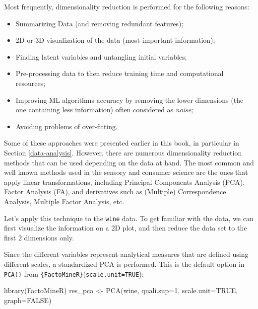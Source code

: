 \documentclass[
]{krantz}
\makeatletter
\newenvironment{Shaded}{\begin{snugshade}}{\end{snugshade}}
\newcommand{\AttributeTok}[1]{\textcolor[rgb]{0.61,0.61,0.61}{#1}}
\newcommand{\ConstantTok}[1]{\textcolor[rgb]{0,0,0}{#1}}
\newcommand{\DecValTok}[1]{\textcolor[rgb]{0.06,0.06,0.06}{#1}}
\newcommand{\FunctionTok}[1]{\textcolor[rgb]{0,0,0}{#1}}
\newcommand{\NormalTok}[1]{#1}
\newcommand{\OtherTok}[1]{\textcolor[rgb]{0.37,0.37,0.37}{#1}}
\providecommand{\tightlist}{%
  \setlength{\itemsep}{0pt}\setlength{\parskip}{0pt}}
\newenvironment{kframe}{%
\medskip{}
\setlength{\fboxsep}{.8em}
 \def\at@end@of@kframe{}%
 \ifinner\ifhmode%
  \def\at@end@of@kframe{\end{minipage}}%
  \begin{minipage}{\columnwidth}%
 \fi\fi%
 \def\FrameCommand##1{\hskip\@totalleftmargin \hskip-\fboxsep
 \colorbox{shadecolor}{##1}\hskip-\fboxsep
     \hskip-\linewidth \hskip-\@totalleftmargin \hskip\columnwidth}%
 \MakeFramed {\advance\hsize-\width
   \@totalleftmargin\z@ \linewidth\hsize
   \@setminipage}}%
 {\par\unskip\endMakeFramed%
 \at@end@of@kframe}
\renewenvironment{Shaded}{\begin{kframe}}{\end{kframe}}
\makeatother
\begin{document}
Most frequently, dimensionality reduction is performed for the following reasons:

\begin{itemize}
\tightlist
\item
  Summarizing Data (and removing redundant features);
\item
  2D or 3D visualization of the data (most important information);
\item
  Finding latent variables and untangling initial variables;
\item
  Pre-processing data to then reduce training time and computational resources;
\item
  Improving ML algorithms accuracy by removing the lower dimensions (the one containing less information) often considered as \emph{noise};
\item
  Avoiding problems of over-fitting.
\end{itemize}

Some of these approaches were presented earlier in this book, in particular in Section \ref{data-analysis}. However, there are numerous dimensionality reduction methods that can be used depending on the data at hand. The most common and well known methods used in the sensory and consumer science are the ones that apply linear transformations, including Principal Components Analysis (PCA), Factor Analysis (FA), and derivatives such as (Multiple) Correspondence Analysis, Multiple Factor Analysis, etc.

Let's apply this technique to the \texttt{wine} data. To get familiar with the data, we can first visualize the information on a 2D plot, and then reduce the data set to the first 2 dimensions only.

Since the different variables represent analytical measures that are defined using different scales, a standardized PCA is performed. This is the default option in \texttt{PCA()} from \texttt{\{FactoMineR\}}(\texttt{scale.unit=TRUE}):

\begin{Shaded}
\begin{Highlighting}[]
\FunctionTok{library}\NormalTok{(FactoMineR)}
\NormalTok{res\_pca }\OtherTok{\textless{}{-}} \FunctionTok{PCA}\NormalTok{(wine, }\AttributeTok{quali.sup=}\DecValTok{1}\NormalTok{, }\AttributeTok{scale.unit=}\ConstantTok{TRUE}\NormalTok{, }\AttributeTok{graph=}\ConstantTok{FALSE}\NormalTok{)}
\end{Highlighting}
\end{Shaded}
\end{document}
